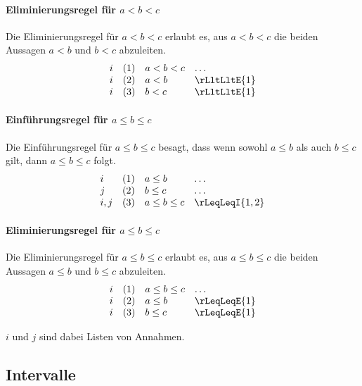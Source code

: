 \documentclass[main.tex]{subfiles}
\begin{document}
\paragraph{Eliminierungsregel für \(a < b < c\)}
Die Eliminierungsregel für \(a < b < c\) erlaubt es, aus \(a < b < c\) die beiden Aussagen \(a < b\) und \(b < c\) abzuleiten.
\[
\begin{array}{llll}
    i & (1) & a < b < c & \dots \\
    i & (2) & a < b & \rLltLltE{1} \\
    i & (3) & b < c & \rLltLltE{1}
\end{array}
\]

\paragraph{Einführungsregel für \(a \leq b \leq c\)}
Die Einführungsregel für \(a \leq b \leq c\) besagt, dass wenn sowohl \(a \leq b\) als auch \(b \leq c\) gilt, dann \(a \leq b \leq c\) folgt.
\[
\begin{array}{llll}
    i   & (1) & a \leq b & \dots \\
    j   & (2) & b \leq c & \dots \\
    i,j & (3) & a \leq b \leq c & \rLeqLeqI{1,2}
\end{array}
\]

\paragraph{Eliminierungsregel für \(a \leq b \leq c\)}
Die Eliminierungsregel für \(a \leq b \leq c\) erlaubt es, aus \(a \leq b \leq c\) die beiden Aussagen \(a \leq b\) und \(b \leq c\) abzuleiten.
\[
\begin{array}{llll}
    i & (1) & a \leq b \leq c & \dots \\
    i & (2) & a \leq b & \rLeqLeqE{1} \\
    i & (3) & b \leq c & \rLeqLeqE{1}
\end{array}
\]

\(i\) und \(j\) sind dabei Listen von Annahmen.

\subsection{Intervalle}
\end{document}
